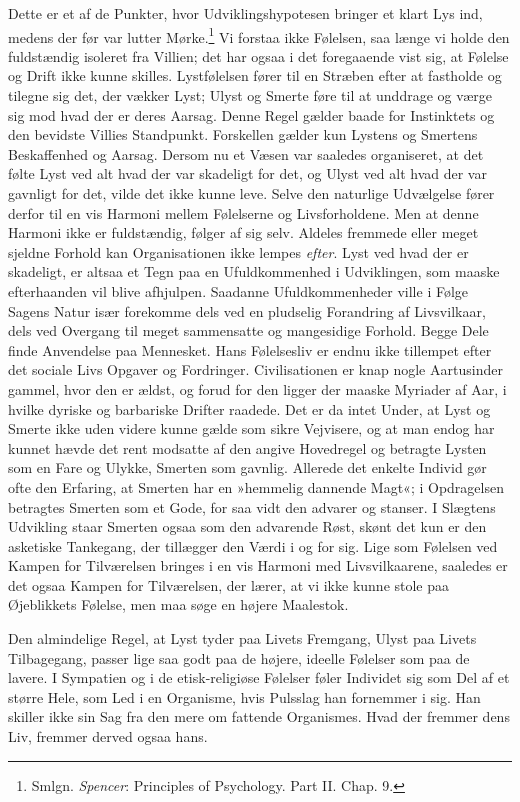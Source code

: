 \documentclass[12pt,a4paper,openany]{book}
\newcommand{\opage}[1]{\marginnote{\footnotesize\textit{[#1]}}}
\begin{document}
Dette er et af de Punkter, hvor Udviklingshypotesen bringer et klart Lys
ind, medens der før var lutter Mørke.\footnote[2]{Smlgn. \emph{Spencer}: Principles of Psychology. Part II. Chap. 9.} Vi forstaa ikke Følelsen,
saa længe vi holde den fuldstændig isoleret fra Villien; det har ogsaa i
det foregaaende vist sig, at Følelse og Drift ikke kunne skilles.
Lystfølelsen fører til en Stræben efter at fastholde og tilegne sig det,
der vækker Lyst; Ulyst og Smerte føre til at unddrage og værge sig mod
hvad der er deres Aarsag. Denne Regel gælder baade for Instinktets og
den bevidste Villies Standpunkt. Forskellen
\opage{325}gælder kun Lystens og Smertens Beskaffenhed og Aarsag. Dersom
nu et Væsen var saaledes organiseret, at det følte Lyst ved alt hvad der
var skadeligt for det, og Ulyst ved alt hvad der var gavnligt for det,
vilde det ikke kunne leve. Selve den naturlige Udvælgelse fører derfor
til en vis Harmoni mellem Følelserne og Livsforholdene. Men at denne
Harmoni ikke er fuldstændig, følger af sig selv. Aldeles fremmede eller
meget sjeldne Forhold kan Organisationen ikke lempes \emph{efter}. Lyst
ved hvad der er skadeligt, er altsaa et Tegn paa en Ufuldkommenhed i
Udviklingen, som maaske efterhaanden vil blive afhjulpen. Saadanne
Ufuldkommenheder ville i Følge Sagens Natur især forekomme dels ved en
pludselig Forandring af Livsvilkaar, dels ved Overgang til meget
sammensatte og mangesidige Forhold. Begge Dele finde Anvendelse paa
Mennesket. Hans Følelsesliv er endnu ikke tillempet efter det sociale
Livs Opgaver og Fordringer. Civilisationen er knap nogle Aartusinder
gammel, hvor den er ældst, og forud for den ligger der maaske Myriader
af Aar, i hvilke dyriske og barbariske Drifter raadede. Det er da intet
Under, at Lyst og Smerte ikke uden videre kunne gælde som sikre
Vejvisere, og at man endog har kunnet hævde det rent modsatte af den
angive Hovedregel og betragte Lysten som en Fare og Ulykke, Smerten som
gavnlig. Allerede det enkelte Individ gør ofte den Erfaring, at Smerten
har en »hemmelig dannende Magt«; i Opdragelsen betragtes Smerten som et
Gode, for saa vidt den advarer og stanser. I Slægtens Udvikling staar
Smerten ogsaa som den advarende Røst, skønt det kun er den asketiske
Tankegang, der tillægger den Værdi i og for sig. Lige som Følelsen ved
Kampen for Tilværelsen bringes i en vis Harmoni med Livsvilkaarene,
saaledes er det ogsaa Kampen for Tilværelsen, der lærer, at vi ikke
kunne stole paa Øjeblikkets Følelse, men maa søge en højere Maalestok.

Den almindelige Regel, at Lyst tyder paa Livets Fremgang, Ulyst paa
Livets Tilbagegang, passer lige saa godt paa de højere, ideelle Følelser
som paa de lavere. I Sympatien og i de etisk-religiøse Følelser føler
Individet sig som Del af et større Hele, som Led i en Organisme, hvis
Pulsslag han fornemmer i sig. Han skiller ikke sin Sag fra den mere om%
\opage{326}fattende Organismes. Hvad der fremmer dens Liv, fremmer
derved ogsaa hans.
\end{document}
